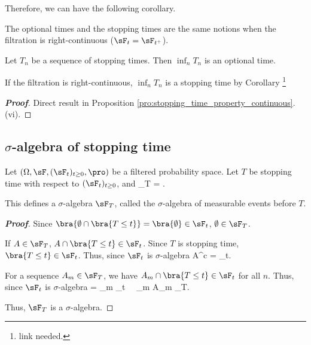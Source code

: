 Therefore, we can have the following corollary.

\begin{corollary}
The optional times and the stopping times are the same notions when the filtration is right-continuous ($\sF_t = \sF_{t^+}$).
\end{corollary}



\begin{proposition}
Let $T_n$ be a sequence of stopping times. Then $\inf_n T_n$ is an optional time.
\end{proposition}

\begin{remark}
If the filtration is right-continuous, $\inf_n T_n$ is a stopping time by Corollary \footnote{link needed.}
\end{remark}

\begin{proof}[\bf Proof]
Direct result in Proposition \ref{pro:stopping_time_property_continuous}.(vi).
\end{proof}


\subsection{$\sigma$-algebra of stopping time}

\begin{definition}\label{def:sigma_algebra_stopping_time_continuous}
Let $(\Omega,\sF, (\sF_t)_{t\geq 0},\pro)$ be a filtered probability space. Let $T$ be stopping time with respect to $(\sF_t)_{t\geq 0}$, and
\be
\sF_T = \bra{A \in\sF : A\cap \{T \leq t\} \in \sF_t,\ \forall t\in [0,\infty)}.
\ee

This defines a $\sigma$-algebra $\sF_T$, called the $\sigma$-algebra of measurable events before $T$.
\end{definition}

\begin{proof}[\bf Proof]
\ben
\item [(i)] Since $\bra{\emptyset \cap \bra{T\leq t}} = \bra{\emptyset} \in \sF_t$, $\emptyset \in \sF_T$.
\item [(ii)] If $A\in \sF_T$, $A \cap \bra{T\leq t} \in \sF_t$. Since $T$ is stopping time, $\bra{T\leq t}\in \sF_t$. Thus, since $\sF_t$ is $\sigma$-algebra
\be
A^c \cap {} =  \bs {} \in \sF_t.
\ee
\item [(iii)] For a sequence $A_m \in \sF_T$, we have $A_m \cap \bra{T\leq t}\in \sF_t$ for all $n$. Thus, since $\sF_t$ is $\sigma$-algebra
\be
{} \cap {} = \bigcup_m  \in \sF_t  \ \ra \ \bigcup_m A_m \in \sF_T.
\ee
\een

Thus, $\sF_T$ is a $\sigma$-algebra.
\end{proof}

